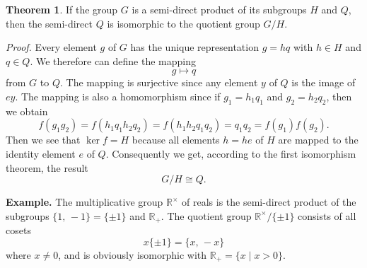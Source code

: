 \documentclass[12pt]{article}
\theoremstyle{definition}
\newtheorem*{thmplain}{Theorem}
\begin{document}
\begin{thmplain}
If the group $G$ is a semi-direct product of its subgroups $H$ and $Q$,
then the semi-direct  $Q$
is isomorphic to the quotient group $G/H$.
\end{thmplain}

{\em Proof.} Every element $g$ of $G$ has the unique representation $g = hq$
with $h\in H$ and $q\in Q$.
We therefore can define the mapping
\[
  g\mapsto q
\]
from $G$ to $Q$.
The mapping is surjective since any element $y$ of $Q$ is the image of $ey$.
The mapping is also a homomorphism since if $g_1 = h_1q_1$ and $g_2 = h_2q_2$, then we obtain
\[
  f(g_1g_2) = f(h_1q_1h_2q_2) = f(h_1h_2q_1q_2) = q_1q_2 = f(g_1)f(g_2).
\]
Then we see that $\ker{f} = H$ because all elements $h = he$ of $H$
are mapped to the identity element $e$ of $Q$.
Consequently we get, according to the  first isomorphism theorem, the result
\[
  G/H \cong Q.
\]

\textbf{Example.}
The multiplicative group $\mathbb{R}^{\times}$ of reals
is the semi-direct product of the subgroups
$\{1,\,-1\} = \{\pm1\}$ and $\mathbb{R}_+$.
The quotient group $\mathbb{R}^{\times}/\{\pm1\}$ consists of all cosets
\[
  x\{\pm1\} = \{x,\,-x\}
\]
where $x\neq 0$, and is obviously isomorphic with
$\mathbb{R}_+ = \{x\mid x > 0\}$.
\end{document}
